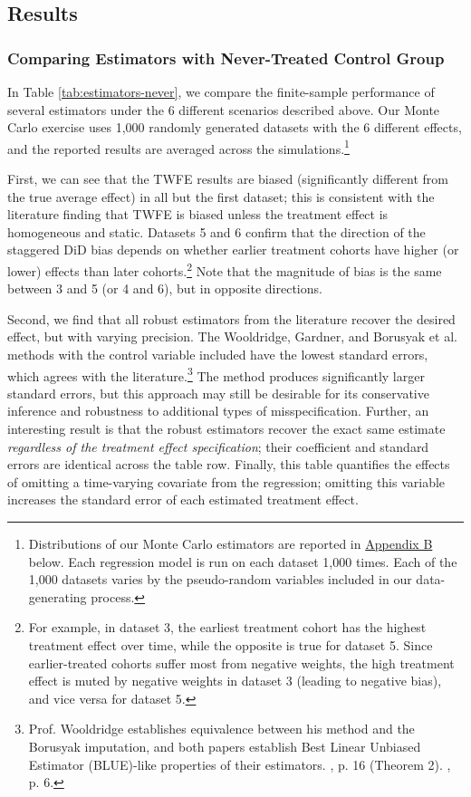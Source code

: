 \documentclass[12pt]{article}
\begin{document}
\subsection{Results}
\subsubsection{Comparing Estimators with Never-Treated Control Group}
In Table \ref{tab:estimators-never}, we compare the finite-sample performance of several estimators under the 6 different scenarios described above. Our Monte Carlo exercise uses 1,000 randomly generated datasets with the 6 different effects, and the reported results are averaged across the simulations.\footnote{Distributions of our Monte Carlo estimators are reported in \hyperref[sec:appendixb]{Appendix B} below. Each regression model is run on each dataset 1,000 times. Each of the 1,000 datasets varies by the pseudo-random variables included in our data-generating process.}

First, we can see that the TWFE results are biased (significantly different from the true average effect) in all but the first dataset; this is consistent with the literature finding that TWFE is biased unless the treatment effect is homogeneous and static. Datasets 5 and 6 confirm that the direction of the staggered DiD bias depends on whether earlier treatment cohorts have higher (or lower) effects than later cohorts.\footnote{For example, in dataset 3, the earliest treatment cohort has the highest treatment effect over time, while the opposite is true for dataset 5. Since earlier-treated cohorts suffer most from negative weights, the high treatment effect is muted by negative weights in dataset 3 (leading to negative bias), and vice versa for dataset 5.}  Note that the magnitude of bias is the same between 3 and 5 (or 4 and 6), but in opposite directions.

Second, we find that all robust estimators from the literature recover the desired effect, but with varying precision. The Wooldridge, Gardner, and Borusyak et al. methods with the control variable included have the lowest standard errors, which agrees with the literature.\footnote{Prof. Wooldridge establishes equivalence between his method and the Borusyak imputation, and both papers establish Best Linear Unbiased Estimator (BLUE)-like properties of their estimators. \citet{borusyak2024revisiting}, p. 16 (Theorem 2). \citet{wooldridge2021two}, p. 6.}  The \citet{CS2021} method produces significantly larger standard errors, but this approach may still be desirable for its conservative inference and robustness to additional types of misspecification. Further, an interesting result is that the robust estimators recover the exact same estimate \textit{regardless of the treatment effect specification}; their coefficient and standard errors are identical across the table row. Finally, this table quantifies the effects of omitting a time-varying covariate from the regression; omitting this variable increases the standard error of each estimated treatment effect.
\end{document}
